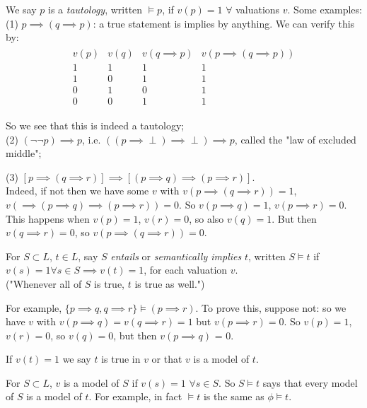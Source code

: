\documentclass[a4paper]{article}
\begin{document}
\begin{defi}
We say $p$ is a \emph{tautology}, written $\vDash p$, if $v(p) = 1$ $\forall$ valuations $v$. Some examples:\\
(1) $p \implies (q \implies p)$: a true statement is implies by anything. We can verify this by:
\begin{equation*}
\begin{aligned}
\begin{matrix}
v(p) & v(q) & v(q \implies p) & v(p \implies (q \implies p))\\
1 & 1 & 1 & 1\\
1 & 0 & 1 & 1\\
0 & 1 & 0 & 1\\
0 & 0 & 1 & 1
\end{matrix}
\end{aligned}
\end{equation*}

So we see that this is indeed a tautology;\\
(2) $(\neg\neg p) \implies p$, i.e. $((p \implies \perp) \implies \perp) \implies p$, called the "law of excluded middle";

(3) $[p \implies (q \implies r)] \implies [(p \implies q) \implies (p \implies r)]$.\\
Indeed, if not then we have some $v$ with $v(p\implies(q \implies r)) = 1$, $v(\implies (p \implies q) \implies (p \implies r)) = 0$. So $v(p\implies q) = 1$, $v(p \implies r) =0$. This happens when $v(p) = 1$, $v(r) = 0$, so also $v(q) = 1$. But then $v(q \implies r)=0$, so $v(p \implies (q \implies r)) = 0$.
\end{defi}

\begin{defi}
For $S \subset L$, $t \in L$, say $S$ \emph{entails} or \emph{semantically implies} $t$, written $S \vDash t$ if $v(s) = 1 \forall s \in S \implies v(t) = 1$, for each valuation $v$.\\
("Whenever all of $S$ is true, $t$ is true as well.")

For example, $\{p \implies q, q \implies r\} \vDash (p \implies r)$. To prove this, suppose not: so we have $v$ with $v(p\implies q) = v(q\implies r) = 1$ but $v(p\implies r) = 0$. So $v(p) = 1$, $v(r) = 0$, so $v(q) = 0$, but then $v(p \implies q)$ = 0.

If $v(t) = 1$ we say $t$ is true in $v$ or that $v$ is a model of $t$.

For $S \subset L$, $v$ is a model of $S$ if $v(s) = 1$ $\forall s \in S$. So $S \vDash t$ says that every model of $S$ is a model of $t$. For example, in fact $\vDash t$ is the same as $\phi \vDash t$.
\end{defi}
\end{document}
